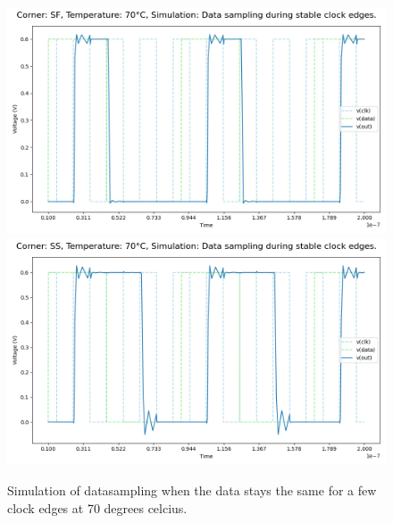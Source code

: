 \begin{figure}[H]
    \vspace{5pt}
    \includegraphics[height= 0.21\textheight]{figures/aimspice/SF70W2.png}
    \vspace{5pt}
    \includegraphics[height= 0.21\textheight]{figures/aimspice/SS70W2.png}
    \caption{Simulation of datasampling when the data stays the same for a few clock edges at 70 degrees celcius.}
    \label{fig:aimspice_W2_70}
\end{figure}

\pagebreak

\pagebreak

